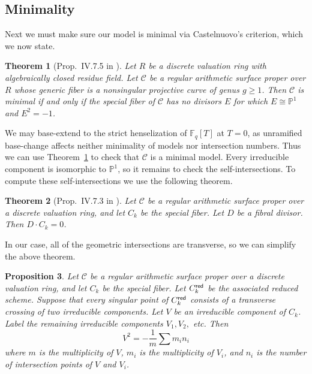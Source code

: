 \documentclass[pagesize,paper=letter]{scrartcl}
\newcommand{\scd}{\mathscr{C}}
\theoremstyle{plain}
\newtheorem{theorem}{Theorem}[section]
\newtheorem{proposition}[theorem]{Proposition}
\theoremstyle{definition}
\theoremstyle{remark}
\newcommand{\isom}{\cong}
\newcommand{\F}{\ensuremath{\mathbb{F}}}
\newcommand{\Pro}{\ensuremath{\mathbb{P}}}
\begin{document}
\subsection{Minimality}
\label{sec:minimality}

Next we must make sure our model is minimal via Castelnuovo's criterion, which we now state.
\begin{theorem}[Prop.~IV.7.5 in \cite{silvermanATAEC}]\label{thm:castelnuovo}
  Let $R$ be a discrete valuation ring with algebraically closed residue field. Let $\scd$ be a regular arithmetic surface proper over $R$ whose generic fiber is a nonsingular projective curve of genus $g \geq 1$. Then $\scd$ is minimal if and only if the special fiber of $\scd$ has no divisors $E$ for which $E \isom \Pro^1$ and $E^2 = -1$.
\end{theorem}

We may base-extend to the strict henselization of $\F_q[T]$ at $T = 0$, as unramified base-change affects neither minimality of models nor intersection numbers. Thus we can use Theorem~\ref{thm:castelnuovo} to check that $\scd$ is a minimal model. Every irreducible component is isomorphic to $\Pro^1$, so it remains to check the self-intersections. To compute these self-intersections we use the following theorem.
\begin{theorem}[Prop.~IV.7.3 in \cite{silvermanATAEC}]\label{thm:fibral-intersect-total}
  Let $\scd$ be a regular arithmetic surface proper over a discrete valuation ring, and let $C_k$ be the special fiber. Let $D$ be a fibral divisor. Then $D \cdot C_k = 0$.
\end{theorem}

In our case, all of the geometric intersections are transverse, so we can simplify the above theorem.
\begin{proposition}\label{prop:transverse-self-intersections}
  Let $\scd$ be a regular arithmetic surface proper over a discrete valuation ring, and let $C_k$ be the special fiber. Let $C_k^{\sf red}$ be the associated reduced scheme. Suppose that every singular point of $C_k^{\sf red}$ consists of a transverse crossing of two irreducible components. Let $V$ be an irreducible component of $C_k$. Label the remaining irreducible components $V_1, V_2,$ etc. Then
  \[
  V^2 = -\frac{1}{m} \sum m_i n_i
  \]
  where $m$ is the multiplicity of $V$, $m_i$ is the multiplicity of $V_i$, and $n_i$ is the number of intersection points of $V$ and $V_i$.
\end{proposition}
\end{document}
